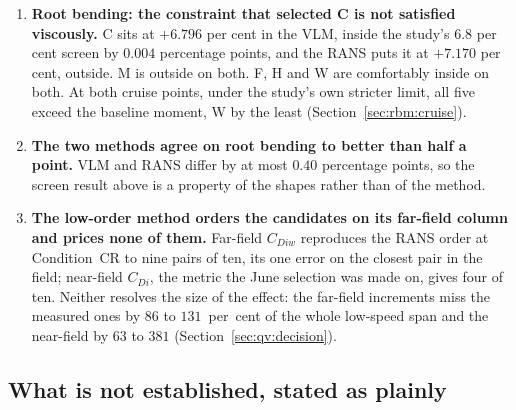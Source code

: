 \begin{enumerate}
    not hinged at all but rotates the whole section about $0.25c$
    (Section~\ref{sec:hinge:hcaveat}).
  \item \textbf{Root bending: the constraint that selected C is not satisfied viscously.} C sits
    at $+6.796$ per cent in the VLM, inside the study's $6.8$ per cent screen by $0.004$
    percentage points, and the RANS puts it at $+7.170$ per cent, outside. M is outside on both.
    F, H and W are comfortably inside on both. At both cruise points, under the study's own
    stricter limit, all five exceed the baseline moment, W by the least
    (Section~\ref{sec:rbm:cruise}).
  \item \textbf{The two methods agree on root bending to better than half a point.} VLM and RANS
    differ by at most $0.40$ percentage points, so the screen result above is a property of the
    shapes rather than of the method.
  \item \textbf{The low-order method orders the candidates on its far-field column and prices
    none of them.} Far-field $C_{Diw}$ reproduces the RANS order at Condition~CR to nine pairs of
    ten, its one error on the closest pair in the field; near-field $C_{Di}$, the metric the June
    selection was made on, gives four of ten. Neither resolves the size of the effect: the
    far-field increments miss the measured ones by $86$ to $131$~per~cent of the whole low-speed
    span and the near-field by $63$ to $381$ (Section~\ref{sec:qv:decision}).
\end{enumerate}

\subsection{What is not established, stated as plainly}
\label{sec:concl:not}
\label{sec:perf:limits}

